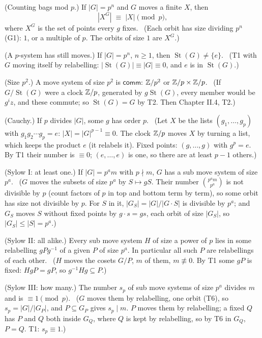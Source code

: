 \begin{lines}
\item[\lab{T1}] (Counting bags mod $p$.) If $|G| = p^n$ and $G$ moves a finite $X$, then \[ |X^G| \;\equiv\; |X| \pmod p , \] where $X^G$ is the set of points every $g$ fixes. \ (Each orbit has size dividing $p^n$ (G1): $1$, or a multiple of $p$. The orbits of size $1$ are $X^G$.)
\item[\lab{T2}] (A $p$-system has still moves.) If $|G| = p^n$, $n \ge 1$, then $\operatorname{St}(G) \ne \{e\}$. \ (T1 with $G$ moving itself by relabelling: $|\operatorname{St}(G)| \equiv |G| \equiv 0$, and $e$ is in $\operatorname{St}(G)$.)
\item[\lab{T3}] (Size $p^2$.) A move system of size $p^2$ is $\mathsf{comm}$: $\mathbb{Z}/p^2$ or $\mathbb{Z}/p \times \mathbb{Z}/p$. \ (If $G / \operatorname{St}(G)$ were a clock $\mathbb{Z}/p$, generated by $g\operatorname{St}(G)$, every member would be $g^i z$, and these commute; so $\operatorname{St}(G) = G$ by T2. Then Chapter II.4, T2.)
\item[\lab{T4}] (Cauchy.) If $p$ divides $|G|$, some $g$ has order $p$. \ (Let $X$ be the lists $(g_1, \dots, g_p)$ with $g_1 g_2 \cdots g_p = e$: $|X| = |G|^{p-1} \equiv 0$. The clock $\mathbb{Z}/p$ moves $X$ by turning a list, which keeps the product $e$ (it relabels it). Fixed points: $(g, \dots, g)$ with $g^p = e$. By T1 their number is $\equiv 0$; $(e, \dots, e)$ is one, so there are at least $p - 1$ others.)
\item[\lab{T5}] (Sylow I: at least one.) If $|G| = p^a m$ with $p \nmid m$, $G$ has a sub move system of size $p^a$. \ ($G$ moves the subsets of size $p^a$ by $S \mapsto gS$. Their number $\binom{p^a m}{p^a}$ is not divisible by $p$ (count factors of $p$ in top and bottom term by term), so some orbit has size not divisible by $p$. For $S$ in it, $|G_S| = |G| / |G \cdot S|$ is divisible by $p^a$; and $G_S$ moves $S$ without fixed points by $g \cdot s = gs$, each orbit of size $|G_S|$, so $|G_S| \le |S| = p^a$.)
\item[\lab{T6}] (Sylow II: all alike.) Every sub move system $H$ of size a power of $p$ lies in some relabelling $gPg^{-1}$ of a given $P$ of size $p^a$. In particular all such $P$ are relabellings of each other. \ ($H$ moves the cosets $G/P$, $m$ of them, $m \not\equiv 0$. By T1 some $gP$ is fixed: $HgP = gP$, so $g^{-1} H g \subseteq P$.)
\item[\lab{T7}] (Sylow III: how many.) The number $s_p$ of sub move systems of size $p^a$ divides $m$ and is $\equiv 1 \pmod p$. \ ($G$ moves them by relabelling, one orbit (T6), so $s_p = |G| / |G_P|$, and $P \subseteq G_P$ gives $s_p \mid m$. $P$ moves them by relabelling; a fixed $Q$ has $P$ and $Q$ both inside $G_Q$, where $Q$ is kept by relabelling, so by T6 in $G_Q$, $P = Q$. T1: $s_p \equiv 1$.)
\end{lines}

